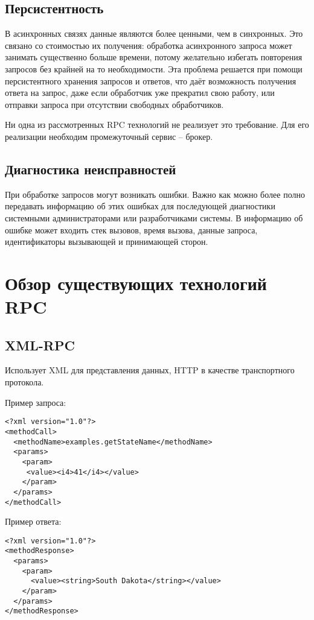 \subsection{Персистентность}
В асинхронных связях данные являются более ценными, чем в синхронных.
Это связано со стоимостью их получения: обработка асинхронного запроса
может занимать существенно больше времени, потому желательно избегать
повторения запросов без крайней на то необходимости. Эта проблема решается
при помощи персистентного хранения запросов и ответов, что даёт возможность
получения ответа на запрос, даже если обработчик уже прекратил свою работу,
или отправки запроса при отсутствии свободных обработчиков.

Ни одна из рассмотренных RPC технологий не реализует это требование.
Для его реализации необходим промежуточный сервис -- брокер.

\subsection{Диагностика неисправностей}
При обработке запросов могут возникать ошибки. Важно как можно более полно
передавать информацию об этих ошибках для последующей диагностики системными
администраторами или разработчиками системы. В информацию об ошибке может
входить стек вызовов, время вызова, данные запроса, идентификаторы вызывающей
и принимающей сторон.

\section{Обзор существующих технологий RPC}
\subsection{XML-RPC}
Использует XML для представления данных, HTTP в качестве транспортного протокола.

\noindent Пример запроса:
\begin{verbatim}
<?xml version="1.0"?>
<methodCall>
  <methodName>examples.getStateName</methodName>
  <params>
    <param>
     <value><i4>41</i4></value>
    </param>
  </params>
</methodCall>
\end{verbatim}

\noindent Пример ответа:
\begin{verbatim}
<?xml version="1.0"?>
<methodResponse>
  <params>
    <param>
      <value><string>South Dakota</string></value>
    </param>
  </params>
</methodResponse>
\end{verbatim}

